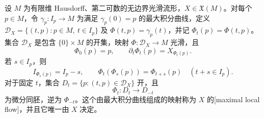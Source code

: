 \begin{theorem}
	\label{g1:thm:maximal-local-flow}
	设 \(M\) 为有限维 Hausdorff、第二可数的无边界光滑流形，\(X\in\mathfrak X(M)\)。对每个 \(p\in M\)，令 \(\gamma_p:I_p\to M\) 为满足 \(\gamma_p(0)=p\) 的最大积分曲线，定义 \(\mathcal D_X=\{(t,p):p\in M,\ t\in I_p\}\) 及 \(\Phi(t,p)=\gamma_p(t)\)，并记 \(\Phi_t(p)=\Phi(t,p)\)。集合 \(\mathcal D_X\) 是包含 \(\{0\}\times M\) 的开集，映射 \(\Phi:\mathcal D_X\to M\) 光滑，且
	\[
		\Phi_0(p)=p,\qquad \partial_t\Phi_t(p)=X_{\Phi_t(p)}.
	\]
	若 \(s\in I_p\)，则
	\begin{equation}
		\label{g1:eq:maximal-flow-time-shift}
		I_{\Phi_s(p)}=I_p-s,
		\qquad \Phi_t(\Phi_s(p))=\Phi_{t+s}(p)\quad(t+s\in I_p).
	\end{equation}
	对于固定 \(t\)，集合 \(D_t=\{p:(t,p)\in\mathcal D_X\}\) 开，且
	\[
		\Phi_t:D_t\longrightarrow D_{-t}
	\]
	为微分同胚，逆为 \(\Phi_{-t}\)。这个由最大积分曲线组成的映射称为 \(X\) 的[maximal local flow]，并且它唯一由 \(X\) 决定。
\end{theorem}
